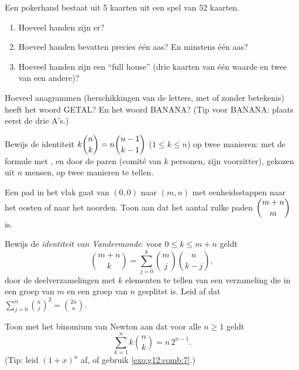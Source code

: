\begin{exercise}[$\star\star$]\label{exo:g12:comb:5}
Een pokerhand bestaat uit 5 kaarten uit een spel van 52 kaarten.
\begin{enumerate}
  \item Hoeveel handen zijn er?
  \item Hoeveel handen bevatten precies één aas? En minstens één aas?
  \item Hoeveel handen zijn een ``full house'' (drie kaarten van één waarde
        en twee van een andere)?
\end{enumerate}
\end{exercise}

\begin{exercise}[$\star\star$]\label{exo:g12:comb:6}
Hoeveel anagrammen (herschikkingen van de letters, met of zonder betekenis)
heeft het woord GETAL? En het woord BANANA? (Tip voor BANANA: plaats eerst de
drie A's.)
\end{exercise}

\begin{exercise}[$\star\star$]\label{exo:g12:comb:7}
Bewijs de identiteit $k\dbinom{n}{k} = n\dbinom{n-1}{k-1}$
($1 \leq k \leq n$) op twee manieren: met de formule met , en door
de paren (comité van $k$ personen, zijn voorzitter), gekozen uit $n$ mensen,
op twee manieren te tellen.
\end{exercise}

\begin{exercise}[$\star\star$]\label{exo:g12:comb:8}
Een pad in het vlak gaat van $(0,0)$ naar $(m, n)$ met eenheidsstappen naar
het oosten of naar het noorden. Toon aan dat het aantal zulke paden
$\dbinom{m+n}{m}$ is.
\end{exercise}

\begin{exercise}[$\star\star\star$]\label{exo:g12:comb:9}
Bewijs de \emph{identiteit van Vandermonde}: voor $0 \leq k \leq m + n$ geldt
\[
\binom{m+n}{k} = \sum_{j=0}^{k} \binom{m}{j}\binom{n}{k-j},
\]
door de deelverzamelingen met $k$ elementen te tellen van een verzameling die
in een groep van $m$ en een groep van $n$ gesplitst is. Leid af dat
$\displaystyle\sum_{j=0}^{n}\binom{n}{j}^{\!2} = \binom{2n}{n}$.
\end{exercise}

\begin{exercise}[$\star\star\star$]\label{exo:g12:comb:10}
Toon met het binomium van Newton aan dat voor alle $n \geq 1$ geldt
\[
\sum_{k=1}^{n} k \binom{n}{k} = n\,2^{n-1}.
\]
(Tip: leid $(1+x)^n$ af, of gebruik \cref{exo:g12:comb:7}.)
\end{exercise}

